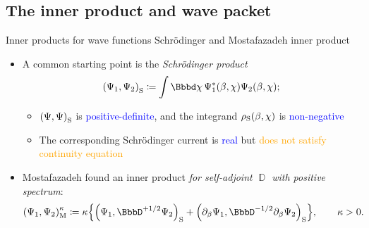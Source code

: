 \documentclass[8pt]{beamer}
\begin{document}
\subsection{The inner product and wave packet}

\begin{frame}%
{Inner products for wave functions}%
{Schrödinger and Mostafazadeh inner product}

\begin{itemize}


\item A common starting point is the
\emph{Schrödinger product}
\begin{align}
\rbr{\Psi_1,\Psi_2}_\text{S} \coloneqq
\int \dd \chi\,\rfun{\Psi_1^*}{\beta,\chi} \rfun{\Psi_2}{\beta,\chi};
\end{align}

\begin{itemize}
\item ${\left(\Psi, \Psi\right)}_\text{S}$ is \textcolor{blue}{positive-definite},
and the integrand ${\rho_\text{S}}\mathopen{}\left(\beta,\chi\right)\mathclose{}$ is
\textcolor{blue}{non-negative}

\item The corresponding Schrödinger current is \textcolor{blue}{real} but
\textcolor{orange}{does not satisfy continuity equation}
\end{itemize}

\item Mostafazadeh found
an inner product \emph{for self-adjoint $\BbbD$ with positive spectrum}:
\begin{align}
\rbr{\Psi_1,\Psi_2}_\text{M}^{\kappa} &\coloneqq\kappa\cbr{
\rbr{\Psi_1,\BbbD^{+1/2}\Psi_2}_\text{S}
+\rbr{\partial_\beta\Psi_1,
\BbbD^{-1/2}\partial_\beta\Psi_2}_\text{S}}, \qquad \kappa > 0.
\end{align}


\end{itemize}
\end{frame}
\end{document}
